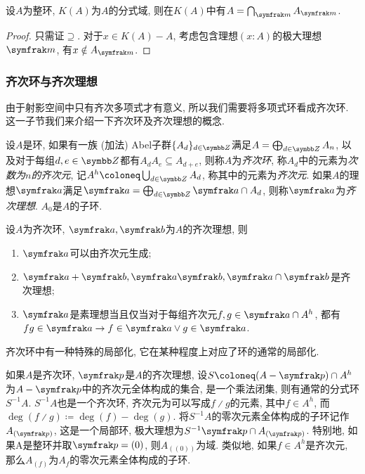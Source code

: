 \begin{proposition}\label{prop:integraldomainlocalizationintersection}
  设$A$为整环, $K(A)$为$A$的分式域, 则在$K(A)$中有$A=\bigcap_{\ideal{m}}A_{\ideal{m}}$.
\end{proposition}

\begin{proof}
  只需证$\supseteq$. 对于$x\in K(A)-A$, 考虑包含理想$(x{:}A)$的极大理想$\ideal{m}$, 有$x\notin A_{\ideal{m}}$.
\end{proof}

\subsubsection{齐次环与齐次理想}

由于射影空间中只有齐次多项式才有意义, 所以我们需要将多项式环看成齐次环. 这一子节我们来介绍一下齐次环及齐次理想的概念.

\begin{definition}
  设$A$是环, 如果有一族 (加法) Abel子群$\{A_d\}_{d\in \ZZ}$满足$A=\bigoplus_{d\in\ZZ}A_n$, 以及对于每组$d, e\in \ZZ$都有$A_dA_e\subseteq A_{d+e}$, 则称$A$为\emph{齐次环}, 称$A_d$中的元素为\emph{次数为$n$的齐次元}, 记$A^h\coloneq\bigcup_{d\in\ZZ}A_d$, 称其中的元素为\emph{齐次元}. 如果$A$的理想$\ideal{a}$满足$\ideal{a}=\bigoplus_{d\in \ZZ}\ideal{a}\cap A_d$, 则称$\ideal{a}$为\emph{齐次理想}. $A_0$是$A$的子环.
\end{definition}

\begin{proposition}
  设$A$为齐次环, $\ideal{a}, \ideal{b}$为$A$的齐次理想, 则
  \begin{enumerate}
    \item $\ideal{a}$可以由齐次元生成;
    \item $\ideal{a}+\ideal{b}, \ideal{a}\ideal{b}, \ideal{a}\cap\ideal{b}$是齐次理想;
    \item $\ideal{a}$是素理想当且仅当对于每组齐次元$f, g\in\ideal{a}\cap A^h$, 都有$fg\in \ideal{a}\rightarrow f\in\ideal{a}\vee g\in\ideal{a}$.
  \end{enumerate}
\end{proposition}

齐次环中有一种特殊的局部化, 它在某种程度上对应了环的通常的局部化.

\begin{definition}
  如果$A$是齐次环, $\ideal{p}$是$A$的齐次理想, 设$S\coloneq (A-\ideal{p})\cap A^h$为$A-\ideal{p}$中的齐次元全体构成的集合, 是一个乘法闭集, 则有通常的分式环$S^{-1}A$. $S^{-1}A$也是一个齐次环, 齐次元为可以写成$f{\divslash}g$的元素, 其中$f\in A^h$, 而$\deg (f{\divslash}g)\coloneq \deg (f)-\deg (g)$. 将$S^{-1}A$的零次元素全体构成的子环记作$A_{(\ideal{p})}$, 这是一个局部环, 极大理想为$S^{-1}\ideal{p}\cap A_{(\ideal{p})}$. 特别地, 如果A是整环并取$\ideal{p}=(0)$, 则$A_{((0))}$为域. 类似地, 如果$f\in A^h$是齐次元, 那么$A_{(f)}$为$A_f$的零次元素全体构成的子环.
\end{definition}

